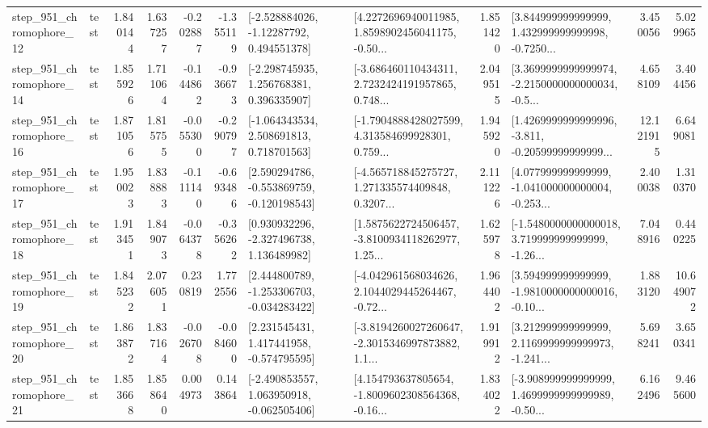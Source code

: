 \begin{tabular}{llrrrrllrlrr}
  step\_951\_chromophore\_12 &      test &      1.840144 &    1.637257 &     -0.202887 & -1.355119 &    [-2.528884026, -1.12287792, 0.494551378] &  [4.2272696940011985, 1.8598902456041175, -0.50... &       1.851420 &  [3.844999999999999, 1.432999999999998, -0.7250... &            3.450056 &          5.029965 \\
  step\_951\_chromophore\_14 &      test &      1.855926 &    1.711064 &     -0.144862 & -0.936673 &    [-2.298745935, 1.256768381, 0.396335907] &  [-3.686460110434311, 2.7232424191957865, 0.748... &       2.049515 &  [3.3699999999999974, -2.2150000000000034, -0.5... &            4.658109 &          3.404456 \\
  step\_951\_chromophore\_16 &      test &      1.871056 &    1.815755 &     -0.055300 & -0.290797 &    [-1.064343534, 2.508691813, 0.718701563] &  [-1.7904888428027599, 4.313584699928301, 0.759... &       1.945920 &  [1.4269999999999996, -3.811, -0.20599999999999... &           12.121915 &          6.649081 \\
  step\_951\_chromophore\_17 &      test &      1.950023 &    1.838883 &     -0.111140 & -0.693486 &   [2.590294786, -0.553869759, -0.120198543] &  [-4.565718845275727, 1.271335574409848, 0.3207... &       2.111226 &  [4.077999999999999, -1.041000000000004, -0.253... &            2.400038 &          1.310370 \\
  step\_951\_chromophore\_18 &      test &      1.913451 &    1.849073 &     -0.064378 & -0.356262 &    [0.930932296, -2.327496738, 1.136489982] &  [1.5875622724506457, -3.8100934118262977, 1.25... &       1.625978 &  [-1.5480000000000018, 3.719999999999999, -1.26... &            7.048916 &          0.440225 \\
  step\_951\_chromophore\_19 &      test &      1.845232 &    2.076051 &      0.230819 &  1.772556 &   [2.444800789, -1.253306703, -0.034283422] &  [-4.042961568034626, 2.1044029445264467, -0.72... &       1.964402 &  [3.594999999999999, -1.9810000000000016, -0.10... &            1.883120 &         10.649072 \\
  step\_951\_chromophore\_20 &      test &      1.863872 &    1.837164 &     -0.026708 & -0.084600 &    [2.231545431, 1.417441958, -0.574795595] &  [-3.8194260027260647, -2.3015346997873882, 1.1... &       1.919912 &  [3.212999999999999, 2.1169999999999973, -1.241... &            5.698241 &          3.650341 \\
  step\_951\_chromophore\_21 &      test &      1.853668 &    1.858640 &      0.004973 &  0.143864 &   [-2.490853557, 1.063950918, -0.062505406] &  [4.154793637805654, -1.8009602308564368, -0.16... &       1.834022 &  [-3.908999999999999, 1.4699999999999989, -0.50... &            6.162496 &          9.465600 \\

\end{tabular}
